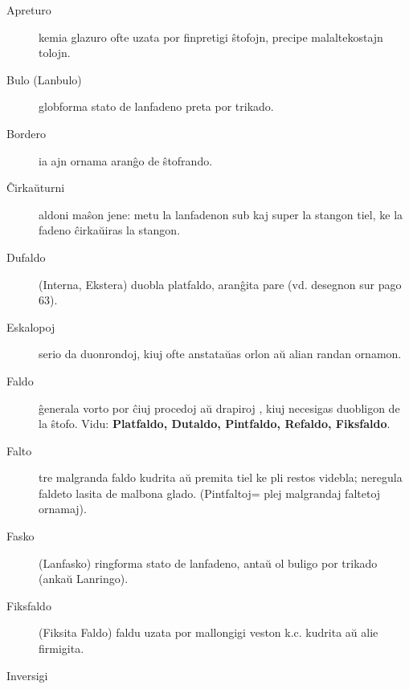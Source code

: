 \begin{description}
\item[Apreturo]

 kemia glazuro ofte uzata por finpretigi ŝtofojn, precipe malaltekostajn tolojn.

\item[Bulo (Lanbulo)]

 globforma stato de lanfadeno preta por trikado.

\item[Bordero]

 ia ajn ornama aranĝo de ŝtofrando.

\item[Ĉirkaŭturni]

 aldoni maŝon jene: metu la lanfadenon sub kaj super la stangon tiel, ke la fadeno ĉirkaŭiras la stangon.

\item[Dufaldo]

(Interna, Ekstera) duobla platfaldo, aranĝita pare (vd. desegnon sur pago 63).

\item[\ast\space Eskalopoj]

 serio da duonrondoj, kiuj ofte anstataŭas orlon aŭ alian randan ornamon.

\item[Faldo]

 ĝenerala vorto por ĉiuj procedoj aŭ drapiroj , kiuj necesigas duobligon de la ŝtofo. Vidu: \textbf{Platfaldo, Dutaldo, Pintfaldo, Refaldo, Fiksfaldo}.

\item[Falto]

 tre malgranda faldo kudrita aŭ premita tiel ke pli restos videbla; neregula faldeto lasita de malbona glado. (Pintfaltoj= plej malgrandaj faltetoj ornamaj).

\item[Fasko]

 (Lanfasko) ringforma stato de lanfadeno, antaŭ ol buligo por trikado (ankaŭ Lanringo).

\item[Fiksfaldo]

 (Fiksita Faldo) faldu uzata por mallongigi veston k.c. kudrita aŭ alie firmigita.

\item[Inversigi]


\end{description}

